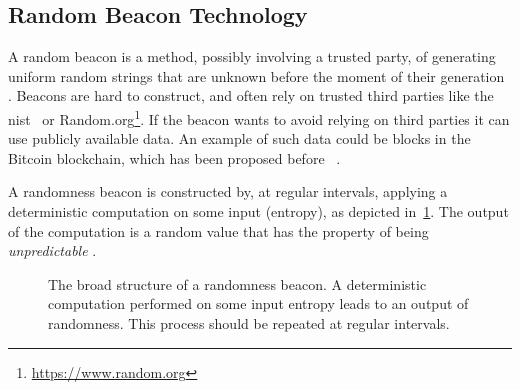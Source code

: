 \subsection{Random Beacon Technology}
A random beacon is a method, possibly involving a trusted party, of generating uniform random strings that are unknown before the moment of their generation~\cite{andrychowicz2014distributed}
.
Beacons are hard to construct, and often rely on trusted third parties like the \acrfull{nist}~\cite{nistbeacon} or Random.org\footnote{\url{https://www.random.org}}.
If the beacon wants to avoid relying on third parties it can use publicly available data.
An example of such data could be blocks in the Bitcoin blockchain, which has been proposed before~\cite{bonneau2015bitcoin} .

A randomness beacon is constructed by, at regular intervals, applying a deterministic computation on some input (entropy), as depicted in~\cref{fig:beacon}. The output of the computation is a random value that has the property of being \emph{unpredictable} .

\begin{figure}[htb]
    \centering
    \caption{The broad structure of a randomness beacon. A deterministic computation performed on some input entropy leads to an output of randomness. This process should be repeated at regular intervals. }\label{fig:beacon}
\end{figure}

